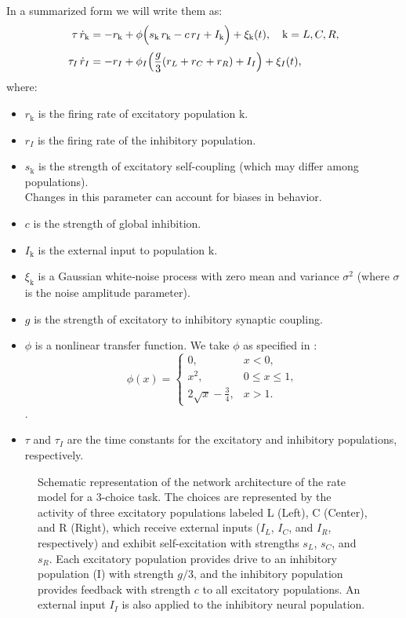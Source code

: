 \documentclass[12,twoside]{TFG-GM}
\theoremstyle{definition}
\theoremstyle{remark}
\newcommand{\kk}{\mathrm{k}}
\begin{document}
In a summarized form we will write them as:
\begin{subequations}
\label{eq:rates-summarized}
\begin{align}
  \tau\,\dot{r}_\kk &= -r_\kk + \phi\Bigl(s_\kk\,r_\kk - c\,r_I + I_\kk \Bigr)+\xi_\kk(t), \quad \kk=L,C,R, \label{eq:exc}\\[1mm]
  \tau_I\,\dot{r}_I &= -r_I + \phi_I\Bigl(\frac{g}{3}(r_L+r_C+r_R)+I_I\Bigr)+\xi_I(t), \label{eq:inh}
\end{align}
\end{subequations}
where:
\begin{itemize}
  \item \(r_\kk\) is the firing rate of excitatory population $\kk$.
  \item $r_I$ is the firing rate of the inhibitory population.
  \item $s_\kk$ is the strength of excitatory self-coupling (which may differ among populations).\\ Changes in this parameter can  account for biases in behavior.
  \item $c$ is the strength of global inhibition.
  \item $I_\kk$ is the external input to population $\kk$.
  \item $\xi_\kk$ is a Gaussian white‐noise process with zero mean and variance $\sigma^{2}$ (where $\sigma$ is the noise amplitude parameter).
  \item $g$ is the strength of excitatory to inhibitory synaptic coupling.
  \item $\phi$ is a nonlinear transfer function. We take $\phi$ as specified in \cite{roxin2019}: 
  \[\displaystyle \phi(x)=\begin{cases}0,&x<0,\\x^2,&0\le x\le1,\\2\sqrt{x}-\tfrac34,&x>1.\end{cases}\].
  \item $\tau$ and $\tau_I$ are the time constants for the excitatory and inhibitory populations, respectively.
\end{itemize}



\begin{figure}[H]
\centering

\caption{Schematic representation of the network architecture of the rate model for a 3-choice task. The choices are represented by the activity of three excitatory populations labeled L (Left), C (Center), and R (Right), which receive external inputs ($I_L$, $I_C$, and $I_R$, respectively) and exhibit self-excitation with strengths $s_L$, $s_C$, and $s_R$. Each excitatory population provides drive to an inhibitory population (I) with strength $g/3$, and the inhibitory population provides feedback with strength $c$ to all excitatory populations. An external input $I_I$ is also applied to the inhibitory neural population.}
\label{fig:model-rates}
\end{figure}
\end{document}
